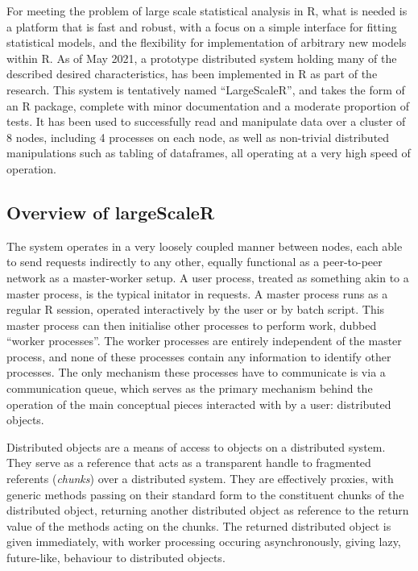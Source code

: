For meeting the problem of large scale statistical analysis in R, what is needed is a platform that is fast and robust, with a focus on a simple interface for fitting statistical models, and the flexibility for implementation of arbitrary new models within R.
As of May 2021, a prototype distributed system holding many of the described desired characteristics, has been implemented in R as part of the research.
This system is tentatively named ``LargeScaleR'', and takes the form of an R package, complete with minor documentation and a moderate proportion of tests.
It has been used to successfully read and manipulate data over a cluster of 8 nodes, including 4 processes on each node, as well as non-trivial distributed manipulations such as tabling of dataframes, all operating at a very high speed of operation.

\subsection{Overview of \textbf{largeScaleR}}\label{sec:sys-imp}

The system operates in a very loosely coupled manner between nodes, each able to send requests indirectly to any other, equally functional as a peer-to-peer network as a master-worker setup.
A user process, treated as something akin to a master process, is the typical initator in requests. 
A master process runs as a regular R session, operated interactively by the user or by batch script.
This master process can then initialise other processes to perform work, dubbed ``worker processes''.
The worker processes are entirely independent of the master process, and none of these processes contain any information to identify other processes.
The only mechanism these processes have to communicate is via a communication queue, which serves as the primary mechanism behind the operation of the main conceptual pieces interacted with by a user: distributed objects.

Distributed objects are a means of access to objects on a distributed system\cite{emmerich2000engineering}.
They serve as a reference that acts as a transparent handle to fragmented referents (\textit{chunks}) over a distributed system.
They are effectively proxies, with generic methods passing on their standard form to the constituent chunks of the distributed object, returning another distributed object as reference to the return value of the methods acting on the chunks.
The returned distributed object is given immediately, with worker processing occuring asynchronously, giving lazy, future-like, behaviour to distributed objects\cite{baker1977incremental}.

